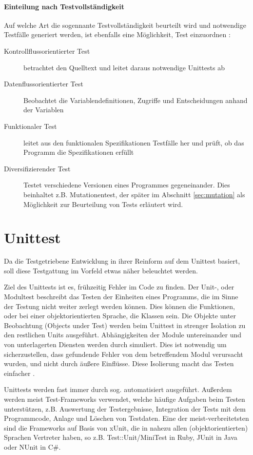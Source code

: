 \paragraph{Einteilung nach Testvollständigkeit} Auf welche Art die sogennante Testvollständigkeit beurteilt wird und notwendige Testfälle generiert werden, ist ebenfalls eine Möglichkeit, Test einzuordnen \citep{liggesmeyer_modultest_1990}:
\begin{description}
 \item[Kontrollflussorientierter Test] betrachtet den Quelltext und leitet daraus notwendige Unittests ab
 \item[Datenflussorientierter Test] Beobachtet die Variablendefinitionen, Zugriffe und Entscheidungen anhand der Variablen
 \item[Funktionaler Test] leitet aus den funktionalen Spezifikationen Testfälle her und prüft, ob das Programm die Spezifikationen erfüllt
 \item[Diversifizierender Test] Testet verschiedene Versionen eines Programmes gegeneinander. Dies beinhaltet z.B. Mutationentest, der später im Abschnitt \ref{sec:mutation} \textit{} als Möglichkeit zur Beurteilung von Tests erläutert wird.
\end{description}
\section{Unittest}
\label{sec:testUnit}
Da die Testgetriebene Entwicklung in ihrer Reinform auf dem Unittest basiert, soll diese Testgattung im Vorfeld etwas näher beleuchtet werden.

Ziel des Unittests ist es, frühzeitig Fehler im Code zu finden. Der Unit-, oder Modultest beschreibt das Testen der Einheiten eines Programms, die im Sinne der Testung nicht weiter zerlegt werden können. Dies können die Funktionen, oder bei einer objektorientierten Sprache, die Klassen sein. Die Objekte unter Beobachtung (Objects under Test) werden beim Unittest in strenger Isolation zu den restlichen Units ausgeführt. Abhängigkeiten der Module untereinander und von unterlagerten Diensten werden durch  simuliert. Dies ist notwendig um sicherzustellen, dass gefundende Fehler von dem betreffendem Modul verursacht wurden, und nicht durch äußere Einflüsse. Diese Isolierung macht das Testen einfacher \citep{goodliffe_code_2006,liggesmeyer_modultest_1990}.



Unittests werden fast immer durch sog.  automatisiert ausgeführt. Außerdem werden meist Test-Frameworks verwendet, welche häufige Aufgaben beim Testen unterstützen, z.B. Auswertung der Testergebnisse, Integration der Tests mit dem Programmcode, Anlage und Löschen von Testdaten.  Eine der meist-verbreitetsten sind die Frameworks auf Basis von xUnit, die in nahezu allen (objektorientierten) Sprachen Vertreter haben, so z.B. Test::Unit/MiniTest in Ruby, JUnit in Java oder NUnit in C\#.

